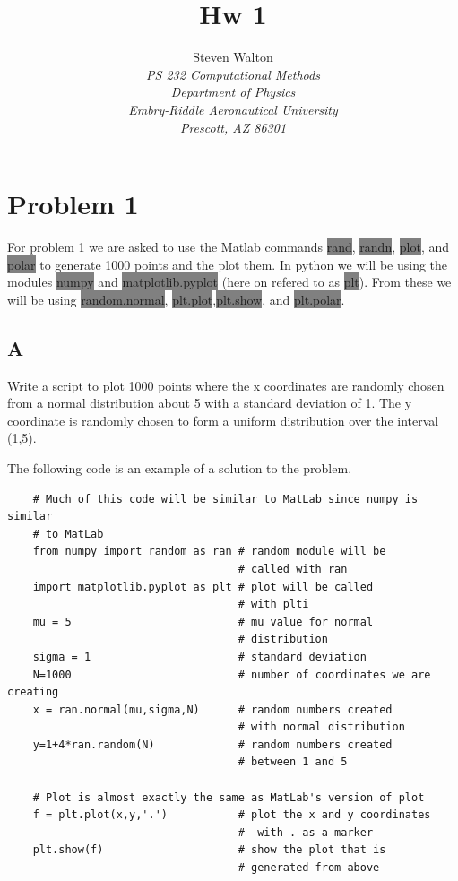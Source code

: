 \documentclass[11pt]{article}   %
\title{Hw 1}
\author{Steven Walton\\     %
\textit{PS 232 Computational Methods}\\
\textit{Department of Physics}\\
\textit{Embry-Riddle Aeronautical University}\\
\textit{Prescott, AZ   86301}}
\newcommand{\gray}[1]{\colorbox{gray}{#1}}
\begin{document}
\maketitle

\section*{Problem 1}
For problem 1 we are asked to use the Matlab commands \gray{rand}, \gray{randn}, \gray{plot}, and \gray{polar} to generate 1000 points and the plot them.
In python we will be using the modules \gray{numpy} and \gray{matplotlib.pyplot} (here on refered to as \gray{plt}).  From these we will be using \gray{random.normal}, \gray{plt.plot},\gray{plt.show}, and \gray{plt.polar}. 
\subsection*{A}
Write a script to plot 1000 points where the x coordinates are randomly chosen from a normal distribution about 5 with a standard deviation of 1.  The y coordinate is randomly chosen to form a uniform distribution over the interval (1,5).


The following code is an example of a solution to the problem.

\begin{tcolorbox} 
   \begin{lstlisting} 
    # Much of this code will be similar to MatLab since numpy is similar 
    # to MatLab
    from numpy import random as ran # random module will be 
                                    # called with ran
    import matplotlib.pyplot as plt # plot will be called 
                                    # with plti
    mu = 5                          # mu value for normal 
                                    # distribution
    sigma = 1                       # standard deviation
    N=1000                          # number of coordinates we are creating
    x = ran.normal(mu,sigma,N)      # random numbers created 
                                    # with normal distribution
    y=1+4*ran.random(N)             # random numbers created 
                                    # between 1 and 5
     
    # Plot is almost exactly the same as MatLab's version of plot
    f = plt.plot(x,y,'.')           # plot the x and y coordinates 
                                    #  with . as a marker
    plt.show(f)                     # show the plot that is 
                                    # generated from above
      \end{lstlisting} 
\end{tcolorbox}
\end{document}
